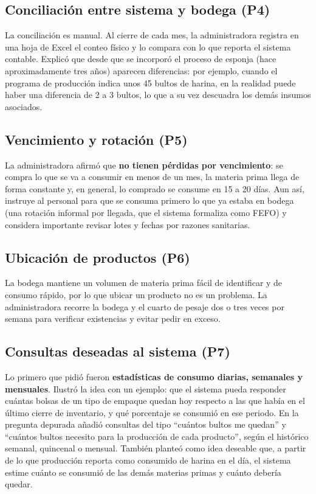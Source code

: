 \subsection{Conciliación entre sistema y bodega (P4)}

La conciliación es manual. Al cierre de cada mes, la administradora registra en una hoja de Excel el conteo físico y lo compara con lo que reporta el sistema contable. Explicó que desde que se incorporó el proceso de esponja (hace aproximadamente tres años) aparecen diferencias: por ejemplo, cuando el programa de producción indica unos 45 bultos de harina, en la realidad puede haber una diferencia de 2 a 3 bultos, lo que a su vez descuadra los demás insumos asociados.

\subsection{Vencimiento y rotación (P5)}

La administradora afirmó que \textbf{no tienen pérdidas por vencimiento}: se compra lo que se va a consumir en menos de un mes, la materia prima llega de forma constante y, en general, lo comprado se consume en 15 a 20 días. Aun así, instruye al personal para que se consuma primero lo que ya estaba en bodega (una rotación informal por llegada, que el sistema formaliza como FEFO) y considera importante revisar lotes y fechas por razones sanitarias.

\subsection{Ubicación de productos (P6)}

La bodega mantiene un volumen de materia prima fácil de identificar y de consumo rápido, por lo que ubicar un producto no es un problema. La administradora recorre la bodega y el cuarto de pesaje dos o tres veces por semana para verificar existencias y evitar pedir en exceso.

\subsection{Consultas deseadas al sistema (P7)}

Lo primero que pidió fueron \textbf{estadísticas de consumo diarias, semanales y mensuales}. Ilustró la idea con un ejemplo: que el sistema pueda responder cuántas bolsas de un tipo de empaque quedan hoy respecto a las que había en el último cierre de inventario, y qué porcentaje se consumió en ese periodo. En la pregunta depurada añadió consultas del tipo ``cuántos bultos me quedan'' y ``cuántos bultos necesito para la producción de cada producto'', según el histórico semanal, quincenal o mensual. También planteó como idea deseable que, a partir de lo que producción reporta como consumido de harina en el día, el sistema estime cuánto se consumió de las demás materias primas y cuánto debería quedar.

